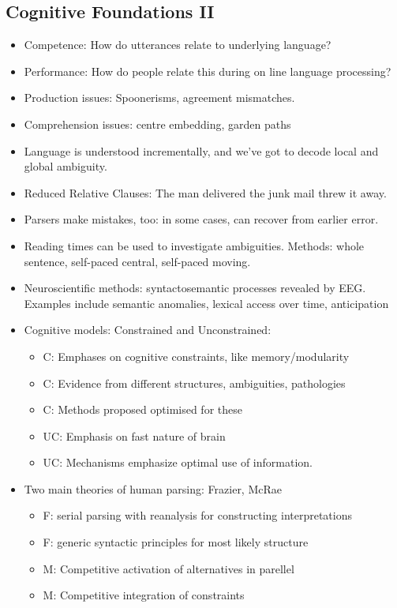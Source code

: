 \documentclass[11pt]{article}
\newenvironment{itemise}{
\begin{itemize}
  \setlength{\itemsep}{1pt}
  \setlength{\parskip}{0pt}
  \setlength{\parsep}{0pt}
}{\end{itemize}}
\begin{document}
\subsection{Cognitive Foundations II}
 \begin{itemise}
 \item Competence: How do utterances relate to underlying language?
 \item Performance: How do people relate this during on line language processing?
 \item Production issues: Spoonerisms, agreement mismatches.
 \item Comprehension issues: centre embedding, garden paths
 \item Language is understood incrementally, and we've got to decode local and global ambiguity.
 \item Reduced Relative Clauses: The man delivered the junk mail threw it away.
 \item Parsers make mistakes, too: in some cases, can recover from earlier error.
 \item Reading times can be used to investigate ambiguities. Methods: whole sentence, self-paced central, self-paced moving.
 \item Neuroscientific methods: syntactosemantic processes revealed by EEG. Examples include semantic anomalies, lexical access over time, anticipation
 \item Cognitive models: Constrained and Unconstrained:
  \begin{itemise}
  \item C: Emphases on cognitive constraints, like memory/modularity
  \item C: Evidence from different structures, ambiguities, pathologies
  \item C: Methods proposed optimised for these
  \item UC: Emphasis on fast nature of brain
  \item UC: Mechanisms emphasize optimal use of information.
 \end{itemise}
 \item Two main theories of human parsing: Frazier, McRae
  \begin{itemise}
  \item F: serial parsing with reanalysis for constructing interpretations
  \item F: generic syntactic principles for most likely structure
  \item M: Competitive activation of alternatives in parellel
  \item M: Competitive integration of constraints
 \end{itemise}
 \end{itemise}
\end{document}
